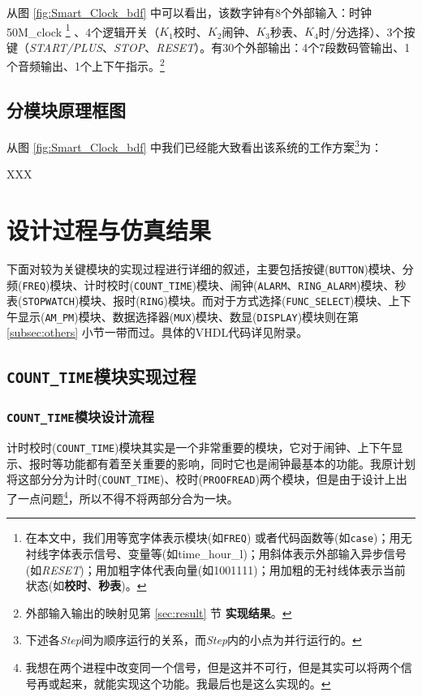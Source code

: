 \documentclass[12pt,AutoFakeBold]{article}
\begin{document}
从图 \ref{fig:Smart_Clock_bdf} 中可以看出，该数字钟有8个外部输入：时钟\textsf{50M\_clock}
\footnote{在本文中，我们用等宽字体表示模块(如\texttt{FREQ}) 或者代码函数等(如\texttt{case})；用无衬线字体表示信号、变量等(如\textsf{time\_hour\_l})；用斜体表示外部输入异步信号(如\textit{RESET})；用加粗字体代表向量(如1001111)；用加粗的无衬线体表示当前状态(如\textsf{\textbf{校时}}、\textsf{\textbf{秒表}})。}
、4个逻辑开关（$K_1$校时、$K_2$闹钟、$K_3$秒表、$K_4$时/分选择）、3个按键（\textit{START/PLUS}、\textit{STOP}、\textit{RESET}）。有30个外部输出：4个7段数码管输出、1个音频输出、1个上下午指示。\footnote{外部输入输出的映射见第 \ref{sec:result} 节 \textbf{实现结果}。}

\subsection{分模块原理框图}
从图 \ref{fig:Smart_Clock_bdf} 中我们已经能大致看出该系统的工作方案\footnote{下述各\textit{Step}间为顺序运行的关系，而\textit{Step}内的小点为并行运行的。}为：

XXX


\section{设计过程与仿真结果}
下面对较为关键模块的实现过程进行详细的叙述，主要包括按键(\texttt{BUTTON})模块、分频(\texttt{FREQ})模块、计时校时(\texttt{COUNT\_TIME})模块、闹钟(\texttt{ALARM}、\texttt{RING\_ALARM})模块、秒表(\texttt{STOPWATCH})模块、报时(\texttt{RING})模块。而对于方式选择(\texttt{FUNC\_SELECT})模块、上下午显示(\texttt{AM\_PM})模块、数据选择器(\texttt{MUX})模块、数显(\texttt{DISPLAY})模块则在第 \ref{subsec:others} 小节一带而过。具体的VHDL代码详见附录。


\subsection{\texttt{COUNT\_TIME}模块实现过程}
\subsubsection{\texttt{COUNT\_TIME}模块设计流程}
计时校时(\texttt{COUNT\_TIME})模块其实是一个非常重要的模块，它对于闹钟、上下午显示、报时等功能都有着至关重要的影响，同时它也是闹钟最基本的功能。我原计划将这部分分为计时(\texttt{COUNT\_TIME})、校时(\texttt{PROOFREAD})两个模块，但是由于设计上出了一点问题\footnote{我想在两个进程中改变同一个信号，但是这并不可行，但是其实可以将两个信号再或起来，就能实现这个功能。我最后也是这么实现的。}，所以不得不将两部分合为一块。
\end{document}
